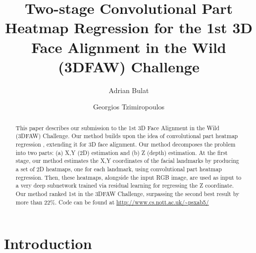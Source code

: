 \documentclass[runningheads]{llncs}
\begin{document}
\pagestyle{headings}
\mainmatter

\title{Two-stage Convolutional Part Heatmap Regression for the 1st 3D Face Alignment in the Wild (3DFAW) Challenge} 



\author{
	Adrian Bulat 
	\and 
	Georgios Tzimiropoulos
}





\maketitle

\begin{abstract}
This paper describes our submission to the 1st 3D Face Alignment in the Wild (3DFAW) Challenge. Our method builds upon the idea of convolutional part heatmap regression \cite{myECCV2016}, extending it for 3D face alignment. Our method decomposes the problem into two parts: (a) X,Y (2D) estimation and (b) Z (depth) estimation. At the first stage, our method estimates the X,Y coordinates of the facial landmarks by producing a set of 2D heatmaps, one for each landmark, using convolutional part heatmap regression. Then, these heatmaps, alongside the input RGB image, are used as input to a very deep subnetwork trained via residual learning for regressing the Z coordinate. Our method ranked 1st in the 3DFAW Challenge, surpassing the second best result by more than 22\%. Code can be found at \url{http://www.cs.nott.ac.uk/~psxab5/}
\end{abstract}


\section{Introduction}
\end{document}
